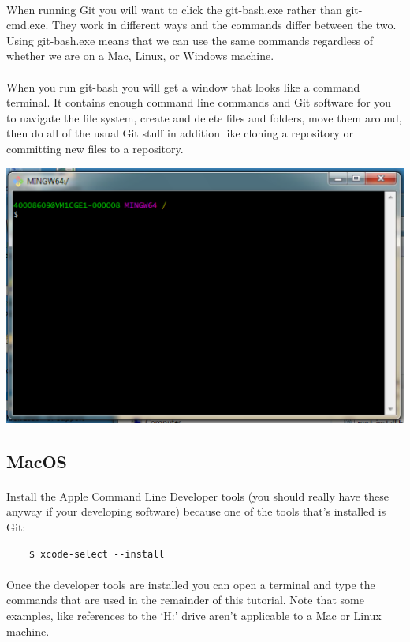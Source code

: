 \documentclass[10pt, a4paper, twosize]{article}
\begin{document}
\paragraph{} When running Git you will want to click the git-bash.exe rather than git-cmd.exe. They work in different ways and the commands differ between the two. Using git-bash.exe means that we can use the same commands regardless of whether we are on a Mac, Linux, or Windows machine.

\paragraph{} When you run git-bash you will get a window that looks like a command terminal. It contains enough command line commands and Git software for you to navigate the file system, create and delete files and folders, move them around, then do all of the usual Git stuff in addition like cloning a repository or committing new files to a repository.

\includegraphics[width=.8\textwidth]{images/git-bash}


\subsection{MacOS}
\paragraph{} Install the Apple Command Line Developer tools (you should really have these anyway if your developing software) because one of the tools that's installed is Git:

\begin{lstlisting}
    $ xcode-select --install 
\end{lstlisting}

\paragraph{} Once the developer tools are installed you can open a terminal and type the commands that are used in the remainder of this tutorial. Note that some examples, like references to the `H:' drive aren't applicable to a Mac or Linux machine.
\end{document}
